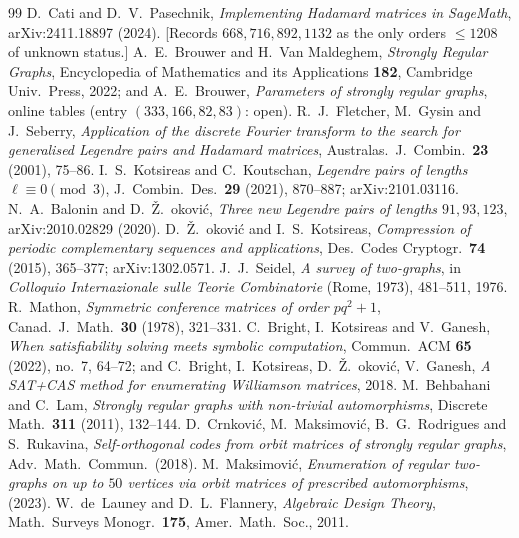 \documentclass[11pt]{article}
\theoremstyle{definition}
\begin{document}
\begin{thebibliography}{99}
 D.~Cati and D.~V.~Pasechnik, \emph{Implementing Hadamard matrices in {SageMath}},
arXiv:2411.18897 (2024). [Records $668,716,892,1132$ as the only orders $\le1208$ of unknown status.]
 A.~E.~Brouwer and H.~Van Maldeghem, \emph{Strongly Regular Graphs}, Encyclopedia of
Mathematics and its Applications \textbf{182}, Cambridge Univ.\ Press, 2022; and A.~E.~Brouwer,
\emph{Parameters of strongly regular graphs}, online tables (entry $(333,166,82,83)$: open).
 R.~J.~Fletcher, M.~Gysin and J.~Seberry, \emph{Application of the discrete Fourier transform
to the search for generalised Legendre pairs and Hadamard matrices}, Australas.\ J.\ Combin.\ \textbf{23}
(2001), 75--86.
 I.~S.~Kotsireas and C.~Koutschan, \emph{Legendre pairs of lengths $\ell\equiv0\pmod 3$},
J.\ Combin.\ Des.\ \textbf{29} (2021), 870--887; arXiv:2101.03116.
 N.~A.~Balonin and D.~\v{Z}.~\DJ okovi\'c, \emph{Three new Legendre pairs of lengths
$91,93,123$}, arXiv:2010.02829 (2020).
 D.~\v{Z}.~\DJ okovi\'c and I.~S.~Kotsireas, \emph{Compression of periodic
complementary sequences and applications}, Des.\ Codes Cryptogr.\ \textbf{74} (2015), 365--377;
arXiv:1302.0571.
 J.~J.~Seidel, \emph{A survey of two-graphs}, in \emph{Colloquio Internazionale sulle
Teorie Combinatorie} (Rome, 1973), 481--511, 1976.
 R.~Mathon, \emph{Symmetric conference matrices of order $pq^2+1$}, Canad.\ J.\ Math.\
\textbf{30} (1978), 321--331.
 C.~Bright, I.~Kotsireas and V.~Ganesh, \emph{When satisfiability solving meets symbolic
computation}, Commun.\ ACM \textbf{65} (2022), no.~7, 64--72; and C.~Bright, I.~Kotsireas,
D.~\v{Z}.~\DJ okovi\'c, V.~Ganesh, \emph{A SAT+CAS method for enumerating Williamson matrices}, 2018.
\bibitem{behbahani} M.~Behbahani and C.~Lam, \emph{Strongly regular graphs with non-trivial automorphisms},
Discrete Math.\ \textbf{311} (2011), 132--144.
 D.~Crnkovi\'c, M.~Maksimovi\'c, B.~G.~Rodrigues and S.~Rukavina, \emph{Self-orthogonal
codes from orbit matrices of strongly regular graphs}, Adv.\ Math.\ Commun.\ (2018).
\bibitem{maksimovic} M.~Maksimovi\'c, \emph{Enumeration of regular two-graphs on up to $50$ vertices via
orbit matrices of prescribed automorphisms}, (2023).
 W.~de~Launey and D.~L.~Flannery, \emph{Algebraic Design Theory}, Math.\ Surveys Monogr.\
\textbf{175}, Amer.\ Math.\ Soc., 2011.
\end{thebibliography}
\end{document}
